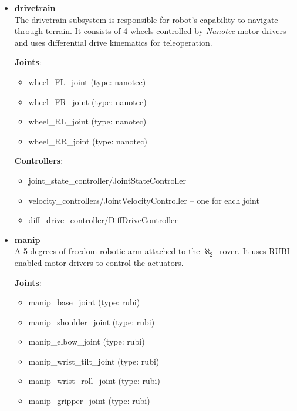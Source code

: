 \documentclass[english,inz,shortabstract]{iithesis}
\newcommand{\val}[1]{\textbf{\textsf{#1}}}
\newcommand{\rovername}{$\aleph_2$\ }
\begin{document}
	\begin{itemize}
		\item \val{drivetrain}\\
		The \textsf{drivetrain} subsystem is responsible for robot's capability to navigate through terrain. It consists of 4 wheels controlled by \textit{Nanotec} motor drivers and uses differential drive kinematics for teleoperation.

		\textbf{Joints}:
		\begin{itemize}[itemsep=0pt, parsep=2pt, topsep=0pt]
			\item \textsf{wheel\_FL\_joint} (type: \textsf{nanotec})
			\item \textsf{wheel\_FR\_joint} (type: \textsf{nanotec})
			\item \textsf{wheel\_RL\_joint} (type: \textsf{nanotec})
			\item \textsf{wheel\_RR\_joint} (type: \textsf{nanotec})
		\end{itemize}

		\textbf{Controllers}:
		\begin{itemize}[itemsep=0pt, parsep=2pt, topsep=0pt]
			\item \textsf{joint\_state\_controller/JointStateController}
			\item \textsf{velocity\_controllers/JointVelocityController} -- one for each joint
			\item \textsf{diff\_drive\_controller/DiffDriveController} 
		\end{itemize}

		\item \val{manip}\\
		A 5 degrees of freedom robotic arm attached to the \rovername rover. It uses  RUBI-enabled motor drivers to control the actuators.

		\textbf{Joints}:
		\begin{itemize}[itemsep=0pt, parsep=2pt, topsep=0pt]
			\item \textsf{manip\_base\_joint} (type: \textsf{rubi})
			\item \textsf{manip\_shoulder\_joint} (type: \textsf{rubi})
			\item \textsf{manip\_elbow\_joint} (type: \textsf{rubi})
			\item \textsf{manip\_wrist\_tilt\_joint} (type: \textsf{rubi})
			\item \textsf{manip\_wrist\_roll\_joint} (type: \textsf{rubi})
			\item \textsf{manip\_gripper\_joint} (type: \textsf{rubi})
		\end{itemize}


\end{itemize}
\end{document}
